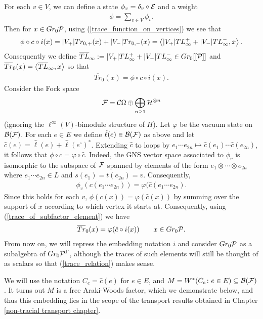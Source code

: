 For each $v\in V$, we can define a state $\phi_v=\delta_v\circ \mathcal{E}$ and a weight
\begin{align*}
\phi=\sum_{v\in V} \phi_v.
\end{align*}
Then for $x\in Gr_0\mathcal{P}$, using (\ref{trace_function_on_vertices}) we see that
\begin{align*}
\phi\circ c\circ i(x) = |V_+|Tr_{0,+}(x) + |V_-|Tr_{0,-}(x) = \left\langle|V_+| TL_\infty^+ + |V_-|TL_\infty^-, x\right\rangle.
\end{align*}
Consequently we define $\overline{TL}_\infty:=|V_+| TL_\infty^+ + |V_-|TL_\infty^-\in Gr_0[[\mathcal{P}]]$ and $\overline{Tr}_0(x)=\left\langle\overline{TL}_\infty, x\right\rangle$ so that
\begin{align}\label{trace_of_subfactor_element}
\overline{Tr}_0(x)= \phi\circ c\circ i(x).
\end{align}
Consider the Fock space
\begin{align*}
\mathcal{F}=\mathcal C\Omega\oplus\bigoplus_{n\geq 1} \mathcal H^{\otimes n}
\end{align*}
(ignoring the $\ell^\infty(V)$-bimodule structure of $H$). Let $\varphi$ be the vacuum state on $\mathcal{B}(\mathcal{F})$. For each $e\in E$ we define $\hat{\ell}(e)\in \mathcal{B}(\mathcal{F})$ as above and let $\hat{c}(e)=\hat{\ell}(e)+\hat{\ell}(e^\circ)^*$. Extending $\hat{c}$ to loops by $e_1\cdots e_{2n}\mapsto \hat{c}(e_1)\cdots \hat{c}(e_{2n})$, it follows that $\phi\circ c=\varphi\circ \hat{c}$. Indeed, the GNS vector space associated to $\phi_v$ is isomorphic to the subspace of $\mathcal{F}$ spanned by elements of the form $e_1\otimes\cdots\otimes e_{2n}$ where $e_1\cdots e_{2n}\in L$ and $s(e_1)=t(e_{2n})=v$. Consequently,
\begin{align*}
\phi_v(c(e_1\cdots e_{2n}))=\varphi(\hat{c}(e_1\cdots e_{2n}).
\end{align*}
Since this holds for each $v$, $\phi(c(x))=\varphi(\hat{c}(x))$ by summing over the support of $x$ according to which vertex it starts at. Consequently, using (\ref{trace_of_subfactor_element}) we have
\begin{align}\label{trace_relation}
\overline{Tr}_0(x)= \varphi(\hat{c}\circ i(x))\qquad x\in Gr_0\mathcal{P}.
\end{align}
From now on, we will repress the embedding notation $i$ and consider $Gr_0\mathcal{P}$ as a subalgebra of $Gr_0\mathcal{P}^\Gamma$, although the traces of such elements will still be thought of as scalars so that (\ref{trace_relation}) makes sense.

We will use the notation $C_e=\hat{c}(e)$ for $e\in E$, and $M=W^*(C_e\colon e\in E)\subseteq \mathcal{B}(\mathcal{F})$. It turns out $M$ is a free Araki-Woods factor, which we demonstrate below, and thus this embedding lies in the scope of the transport results obtained in Chapter \ref{non-tracial transport chapter}.




